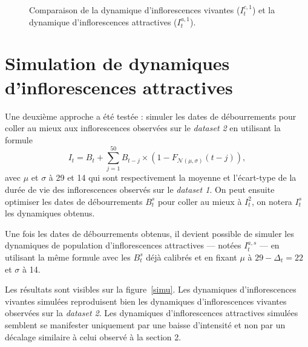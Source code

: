 \documentclass[a4paper, 11pt]{article}
\begin{document}
%  
% 

\begin{figure}[ht]
 \centering
 \caption{Comparaison de la dynamique d'inflorescences vivantes ($I_t^{c,1}$) et la dynamique d'inflorescences attractives ($I_t^{a,1}$).}
 \label{DS1A}
\end{figure}


\section{Simulation de dynamiques d'inflorescences attractives}

Une deuxième approche a été testée : simuler les dates de débourrements pour coller au mieux aux inflorescences observées sur le \textit{dataset 2} en utilisant la formule
$$I_t = B_t + \sum_{j = 1}^{50} B_{t-j}\times \left( 1 - F_{\mathcal{N}\left( \mu, \sigma \right)}(t-j) \right),$$
avec $\mu$ et $\sigma$ à 29 et 14 qui sont respectivement la moyenne et l’écart-type de la durée de vie des inflorescences observés sur le \textit{dataset 1}. On peut ensuite optimiser les dates de débourrements $B_t^s$ pour coller au mieux à $I_t^2$, on notera $I_t^s$ les dynamiques obtenus.

Une fois les dates de débourrements obtenus, il devient possible de simuler les dynamiques de population d’inflorescences
attractives --- notées $I_t^{a, s}$ --- en utilisant la même formule avec les $B_t^s$ déjà calibrés et en fixant $\mu$ à $29 - \Delta_t = 22$ et $\sigma$ à 14.


Les résultats sont visibles sur la figure~\ref{simu}. Les dynamiques d'inflorescences vivantes simulées reproduisent bien les dynamiques d'inflorescences vivantes observées sur la \textit{dataset 2}. Les dynamiques d'inflorescences attractives simulées semblent se manifester uniquement par une baisse d'intensité et non par un décalage similaire à celui observé à la section 2.
\end{document}
